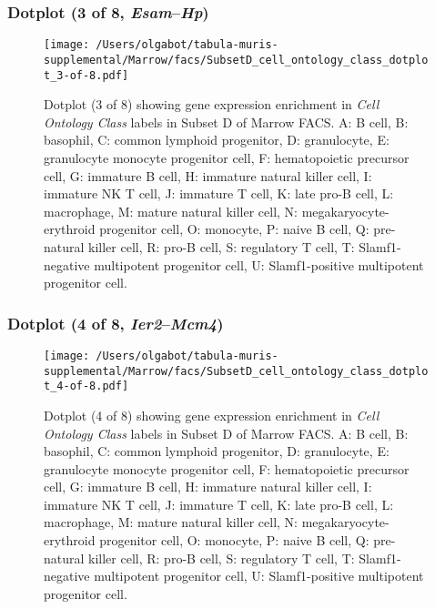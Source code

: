 \subsubsection{Dotplot (3 of 8, \emph{Esam}--\emph{Hp})}
\begin{figure}[h]
\centering
\texttt{[image: /Users/olgabot/tabula-muris-supplemental/Marrow/facs/SubsetD\_cell\_ontology\_class\_dotplot\_3-of-8.pdf]}

\caption{ Dotplot (3 of 8)  showing gene expression enrichment in \emph{Cell Ontology Class} labels in Subset D of Marrow FACS. A: B cell, B: basophil, C: common lymphoid progenitor, D: granulocyte, E: granulocyte monocyte progenitor cell, F: hematopoietic precursor cell, G: immature B cell, H: immature natural killer cell, I: immature NK T cell, J: immature T cell, K: late pro-B cell, L: macrophage, M: mature natural killer cell, N: megakaryocyte-erythroid progenitor cell, O: monocyte, P: naive B cell, Q: pre-natural killer cell, R: pro-B cell, S: regulatory T cell, T: Slamf1-negative multipotent progenitor cell, U: Slamf1-positive multipotent progenitor cell.}
\end{figure}


\clearpage

\subsubsection{Dotplot (4 of 8, \emph{Ier2}--\emph{Mcm4})}
\begin{figure}[h]
\centering
\texttt{[image: /Users/olgabot/tabula-muris-supplemental/Marrow/facs/SubsetD\_cell\_ontology\_class\_dotplot\_4-of-8.pdf]}

\caption{ Dotplot (4 of 8)  showing gene expression enrichment in \emph{Cell Ontology Class} labels in Subset D of Marrow FACS. A: B cell, B: basophil, C: common lymphoid progenitor, D: granulocyte, E: granulocyte monocyte progenitor cell, F: hematopoietic precursor cell, G: immature B cell, H: immature natural killer cell, I: immature NK T cell, J: immature T cell, K: late pro-B cell, L: macrophage, M: mature natural killer cell, N: megakaryocyte-erythroid progenitor cell, O: monocyte, P: naive B cell, Q: pre-natural killer cell, R: pro-B cell, S: regulatory T cell, T: Slamf1-negative multipotent progenitor cell, U: Slamf1-positive multipotent progenitor cell.}
\end{figure}


\clearpage


